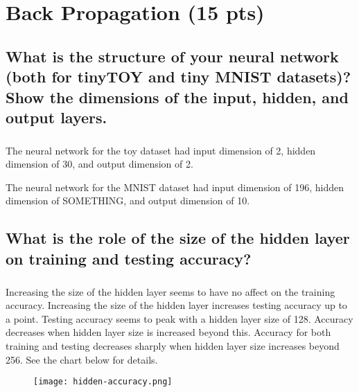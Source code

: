 \documentclass[11pt]{article}
\begin{document}
\thispagestyle{empty}

\newlength{\boxlength}\setlength{\boxlength}{\textwidth}
\addtolength{\boxlength}{-4mm}

\begin{center}
\end{center}




\section{Back Propagation (15 pts)}

\subsection{What is the structure of your neural network (both for tinyTOY and tiny MNIST datasets)? Show the dimensions of the input, hidden, and output layers.}

\subparagraph{}

The neural network for the toy dataset had input dimension of 2, hidden dimension of 30, and output dimension of 2.

The neural network for the MNIST dataset had input dimension of 196, hidden dimension of SOMETHING, and output dimension of 10.

\subsection{What is the role of the size of the hidden layer on training and testing accuracy?}

\subparagraph{}

Increasing the size of the hidden layer seems to have no affect on the training accuracy. Increasing the size of the hidden layer increases testing accuracy up to a point. Testing accuracy seems to peak with a hidden layer size of 128. Accuracy decreases when hidden layer size is increased beyond this. Accuracy for both training and testing decreases sharply when hidden layer size increases beyond 256. See the chart below for details.

\begin{figure}[h]
	\texttt{[image: hidden-accuracy.png]}
	\label{fig:graph}
\end{figure}
\end{document}
